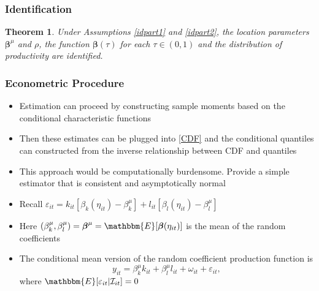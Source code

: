 \documentclass[xcolor={dvipsnames}, notheorems]{beamer}
\theoremstyle{plain}
\newtheorem{theorem}{Theorem}
\begin{document}

\begin{frame}
\frametitle{Identification}
\begin{theorem} \label{idtheorem}
Under Assumptions \ref{idpart1} and \ref{idpart2}, the location parameters $\boldsymbol{\beta}^{\mu}$ and $\rho$, the function $\boldsymbol{\beta}(\tau)$ for each $\tau\in(0,1)$ and the distribution of productivity are identified.
\end{theorem}
\end{frame}


\begin{frame}
\frametitle{Econometric Procedure}
\begin{itemize}
    \item Estimation can proceed by constructing sample moments based on the conditional characteristic functions
    \item Then these estimates can be plugged into \eqref{CDF} and the conditional quantiles can constructed from the inverse relationship between CDF and quantiles
    \item This approach would be computationally burdensome. Provide a simple estimator that is consistent and asymptotically normal
    \item Recall $\varepsilon_{it}=k_{it}[\beta_{k}(\eta_{it})-\beta^{\mu}_{k}]+l_{it}[\beta_{l}(\eta_{it})-\beta^{\mu}_{l}]$ 
    \item Here $(\beta_{k}^{\mu}, \beta_{l}^{\mu})=\boldsymbol{\beta}^{\mu}=\mathbbm{E}[\boldsymbol{\beta}(\eta_{it})]$ is the mean of the random coefficients
    \item The conditional mean version of the random coefficient production function is 
    \begin{equation}
    y_{it}=\beta_{k}^{\mu}k_{it}+\beta_{l}^{\mu}l_{it}+\omega_{it}+\varepsilon_{it},
    \end{equation}
    where $\mathbbm{E}[\varepsilon_{it}|\mathcal{I}_{it}]=0$
\end{itemize}
\end{frame}


\end{document}
